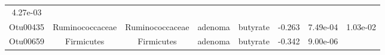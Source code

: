 \documentclass[11pt,]{article}
\begin{document}
\begin{longtable}[]{@{}cccccccc@{}}
\begin{minipage}[t]{0.08\columnwidth}
4.27e-03\strut
\end{minipage}\tabularnewline
\begin{minipage}[t]{0.08\columnwidth}\centering\strut
Otu00435\strut
\end{minipage} & \begin{minipage}[t]{0.15\columnwidth}\centering\strut
Ruminococcaceae\strut
\end{minipage} & \begin{minipage}[t]{0.15\columnwidth}\centering\strut
Ruminococcaceae\strut
\end{minipage} & \begin{minipage}[t]{0.08\columnwidth}\centering\strut
adenoma\strut
\end{minipage} & \begin{minipage}[t]{0.09\columnwidth}\centering\strut
butyrate\strut
\end{minipage} & \begin{minipage}[t]{0.07\columnwidth}\centering\strut
-0.263\strut
\end{minipage} & \begin{minipage}[t]{0.08\columnwidth}\centering\strut
7.49e-04\strut
\end{minipage} & \begin{minipage}[t]{0.08\columnwidth}\centering\strut
1.03e-02\strut
\end{minipage}\tabularnewline
\begin{minipage}[t]{0.08\columnwidth}\centering\strut
Otu00659\strut
\end{minipage} & \begin{minipage}[t]{0.15\columnwidth}\centering\strut
Firmicutes\strut
\end{minipage} & \begin{minipage}[t]{0.15\columnwidth}\centering\strut
Firmicutes\strut
\end{minipage} & \begin{minipage}[t]{0.08\columnwidth}\centering\strut
adenoma\strut
\end{minipage} & \begin{minipage}[t]{0.09\columnwidth}\centering\strut
butyrate\strut
\end{minipage} & \begin{minipage}[t]{0.07\columnwidth}\centering\strut
-0.342\strut
\end{minipage} & \begin{minipage}[t]{0.08\columnwidth}\centering\strut
9.00e-06\strut
\end{minipage} & \begin{minipage}[t]{0.08\columnwidth}\centering\strut

\end{minipage}
\end{longtable}
\end{document}
